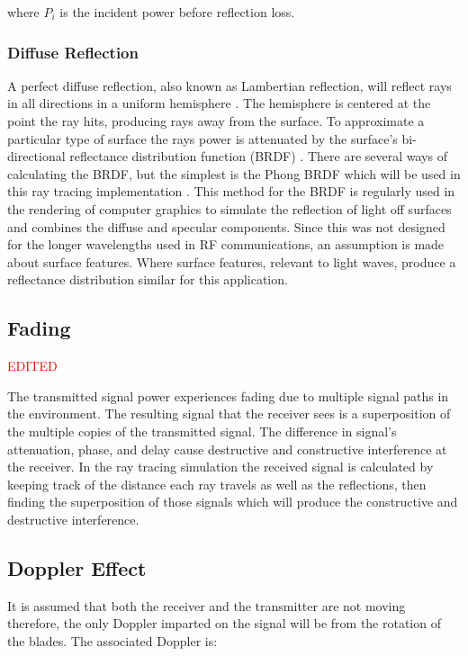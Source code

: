 where $P_i$ is the incident power before reflection loss.

\subsubsection{Diffuse Reflection}
A perfect diffuse reflection, also known as Lambertian reflection, will reflect rays in all directions in a uniform hemisphere \cite{Sizun2005}. The hemisphere is centered at the point the ray hits, producing rays away from the surface. To approximate a particular type of surface the rays power is attenuated by the surface's bi-directional reflectance distribution function (BRDF) \cite{Suffern2007, Pharr2010, Glassner1995}. There are several ways of calculating the BRDF, but the simplest is the Phong BRDF which will be used in this ray tracing implementation \cite{Phong:1998:ICG:280811.280980}. This method for the BRDF is regularly used in the rendering of computer graphics to simulate the reflection of light off surfaces and combines the diffuse and specular components. Since this was not designed for the longer wavelengths used in RF communications, an assumption is made about surface features. Where surface features, relevant to light waves,  produce a reflectance distribution similar for this application. 


\subsection{Fading}
\textcolor{red}{EDITED}

The transmitted signal power experiences fading due to multiple signal paths in the environment. The resulting signal that the receiver sees is a superposition of the multiple copies of the transmitted signal. The difference in signal's attenuation, phase, and delay cause destructive and constructive interference at the receiver. In the ray tracing simulation the received signal is calculated by keeping track of the distance each ray travels as well as the reflections, then finding the superposition of those signals which will produce the constructive and destructive interference.

\subsection{Doppler Effect}
It is assumed that both the receiver and the transmitter are not moving therefore, the only Doppler imparted on the signal will be from the rotation of the blades. The associated Doppler is:

